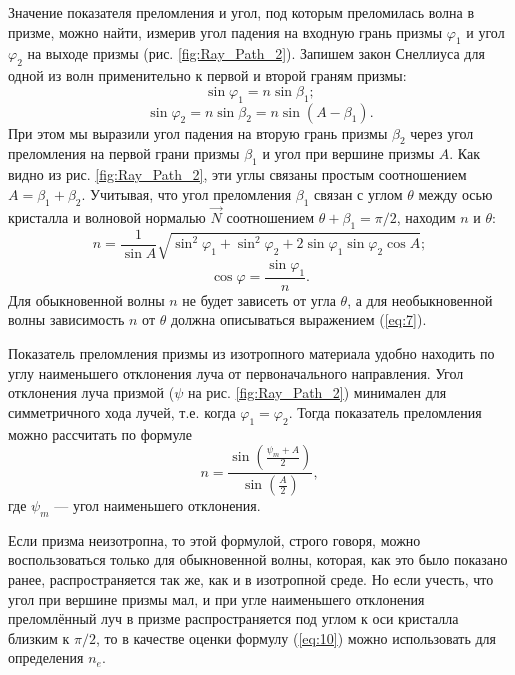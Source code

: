 \documentclass[a4paper, 12pt]{article}
\begin{document}
	 Значение показателя преломления и угол, под которым преломилась волна в призме, можно найти, измерив угол падения на входную грань призмы $\varphi_1$ и угол $\varphi_2$ на выходе призмы (рис. \ref{fig:Ray_Path_2}). Запишем закон Снеллиуса для одной из волн применительно к первой и второй граням призмы:
	 \begin{equation*}
	 	\sin\varphi_1=n\sin\beta_1;
	 \end{equation*}
	 \begin{equation*}
	 	\sin\varphi_2=n\sin\beta_2=n\sin\left(A-\beta_1\right).
	 \end{equation*}
	 При этом мы выразили угол падения на вторую грань призмы $\beta_2$ через угол преломления на первой грани призмы $\beta_1$ и угол при вершине призмы $A$. Как видно из рис. \ref{fig:Ray_Path_2}, эти углы связаны простым соотношением $A=\beta_1+\beta_2$. Учитывая, что угол преломления $\beta_1$ связан с углом $\theta$ между осью кристалла и волновой нормалью $\vec{N}$ соотношением $\theta+\beta_1=\pi/2$, находим $n$ и $\theta$:
	 \begin{equation}
	 	n=\frac{1}{\sin A}\sqrt{\sin^2\varphi_1+\sin^2\varphi_2+2\sin\varphi_1\sin\varphi_2\cos A};
	 	\label{eq:9}
	 \end{equation}
	 \begin{equation*}
	 \cos\varphi=\frac{\sin\varphi_1}{n}.	
	 \end{equation*}
	 Для обыкновенной волны $n$ не будет зависеть от угла $\theta$, а для необыкновенной волны зависимость $n$ от $\theta$ должна описываться выражением (\ref{eq:7}).\par
	 Показатель преломления призмы из изотропного материала удобно находить по углу наименьшего отклонения луча от первоначального направления. Угол отклонения луча призмой ($\psi$ на рис. \ref{fig:Ray_Path_2}) минимален для симметричного хода лучей, т.е. когда $\varphi_1=\varphi_2$. Тогда показатель преломления можно рассчитать по формуле
	 \begin{equation}
	 	n=\frac{\sin\left(\frac{\psi_m+A}{2}\right)}{\sin\left(\frac{A}{2}\right)},
	 	\label{eq:10}
	 \end{equation}
	 где $\psi_m$ — угол наименьшего отклонения.\par
	Если призма неизотропна, то этой формулой, строго говоря, можно воспользоваться только для обыкновенной волны, которая, как это было показано ранее, распространяется так же, как и в изотропной среде. Но если учесть, что угол при вершине призмы мал, и при угле наименьшего отклонения преломлённый луч в призме распространяется под углом к оси кристалла близким к $\pi/2$, то в качестве оценки формулу (\ref{eq:10}) можно использовать для определения $n_e$.
	\newpage
\end{document}
